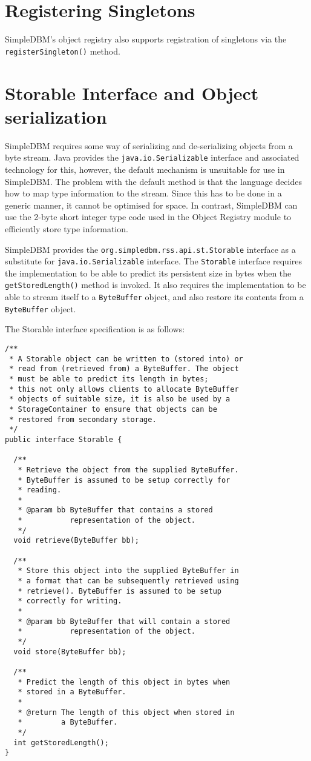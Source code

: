 \documentclass[a4paper,draft,oneside]{book}
\begin{document}
\section{Registering Singletons}
SimpleDBM's object registry also supports registration of
singletons via the \verb|registerSingleton()| method. 

\section{Storable Interface and Object serialization}
SimpleDBM requires some way of serializing and de-serializing
objects from a byte stream. Java provides the \verb|java.io.Serializable|
interface and associated technology for this, however, the default
mechanism is unsuitable for use in SimpleDBM. The problem with the
default method is that the language decides how to map type
information to the stream. Since this has to be done in a generic
manner, it cannot be optimised for space. In contrast, SimpleDBM can
use the 2-byte short integer type code used in the Object Registry
module to efficiently store type information.

SimpleDBM provides the \verb|org.simpledbm.rss.api.st.Storable|
interface as a substitute for \verb|java.io.Serializable| interface. The
\verb|Storable| interface requires the implementation to be able to predict
its persistent size in bytes when the \verb|getStoredLength()| method is invoked. It
also requires the implementation to be able to stream itself to a
\verb|ByteBuffer| object, and also restore its contents from a
\verb|ByteBuffer| object.

The Storable interface specification is as follows:

\begin{verbatim}
/**
 * A Storable object can be written to (stored into) or 
 * read from (retrieved from) a ByteBuffer. The object 
 * must be able to predict its length in bytes;
 * this not only allows clients to allocate ByteBuffer 
 * objects of suitable size, it is also be used by a 
 * StorageContainer to ensure that objects can be
 * restored from secondary storage.
 */
public interface Storable {

  /**
   * Retrieve the object from the supplied ByteBuffer. 
   * ByteBuffer is assumed to be setup correctly for 
   * reading.
   * 
   * @param bb ByteBuffer that contains a stored 
   *           representation of the object.
   */
  void retrieve(ByteBuffer bb);

  /**
   * Store this object into the supplied ByteBuffer in 
   * a format that can be subsequently retrieved using 
   * retrieve(). ByteBuffer is assumed to be setup 
   * correctly for writing.
   * 
   * @param bb ByteBuffer that will contain a stored 
   *           representation of the object.
   */
  void store(ByteBuffer bb);

  /**
   * Predict the length of this object in bytes when 
   * stored in a ByteBuffer.
   * 
   * @return The length of this object when stored in 
   *         a ByteBuffer.
   */
  int getStoredLength();
}
\end{verbatim}
\end{document}
